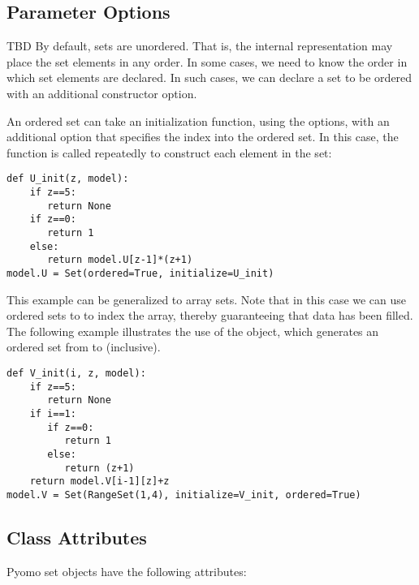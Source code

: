 \subsection{Parameter Options}

TBD
By default, sets are unordered.  That is, the internal representation
may place the set elements in any order.  In some cases, we need to know
the order in which set elements are declared.  In such cases, we can declare
a set to be ordered with an additional constructor option.  

An ordered set can take an 
initialization function, using the  options, with an additional option 
that specifies the index into the ordered set.  In this case, the function is 
called repeatedly to construct each element in the set:
\begin{lstlisting}
def U_init(z, model):
    if z==5:
       return None
    if z==0:
       return 1
    else:
       return model.U[z-1]*(z+1)
model.U = Set(ordered=True, initialize=U_init)
\end{lstlisting}
This example can be generalized to array sets.  Note that in this case
we can use ordered sets to to index the array, thereby guaranteeing that
data has been filled.  The following example illustrates the use of the
 object, which generates an ordered set from  to 
(inclusive).
\begin{lstlisting}
def V_init(i, z, model):
    if z==5:
       return None
    if i==1:
       if z==0:
          return 1
       else:
          return (z+1)
    return model.V[i-1][z]+z
model.V = Set(RangeSet(1,4), initialize=V_init, ordered=True)
\end{lstlisting}
\fi

\subsection{Class Attributes}

Pyomo set objects have the following attributes:

